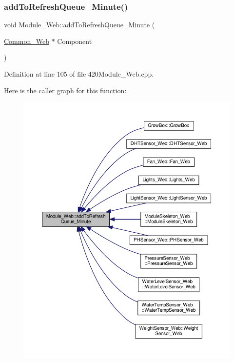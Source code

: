 \subsubsection{\texorpdfstring{add\+To\+Refresh\+Queue\+\_\+\+Minute()}{addToRefreshQueue\_Minute()}\hspace{0.1cm}{\footnotesize\ttfamily [1/2]}}
{\footnotesize\ttfamily void Module\+\_\+\+Web\+::add\+To\+Refresh\+Queue\+\_\+\+Minute (\begin{DoxyParamCaption}\item[{\hyperlink{class_common___web}{Common\+\_\+\+Web} $\ast$}]{Component }\end{DoxyParamCaption})}



Definition at line 105 of file 420\+Module\+\_\+\+Web.\+cpp.

Here is the caller graph for this function\+:
\nopagebreak
\begin{figure}[H]
\begin{center}
\leavevmode
\includegraphics[width=350pt]{class_module___web_ac449bdaf2aae62ba30ee63a58b1bdd5d_icgraph}
\end{center}
\end{figure}
\mbox{\label{class_module___web_ac449bdaf2aae62ba30ee63a58b1bdd5d}} 
